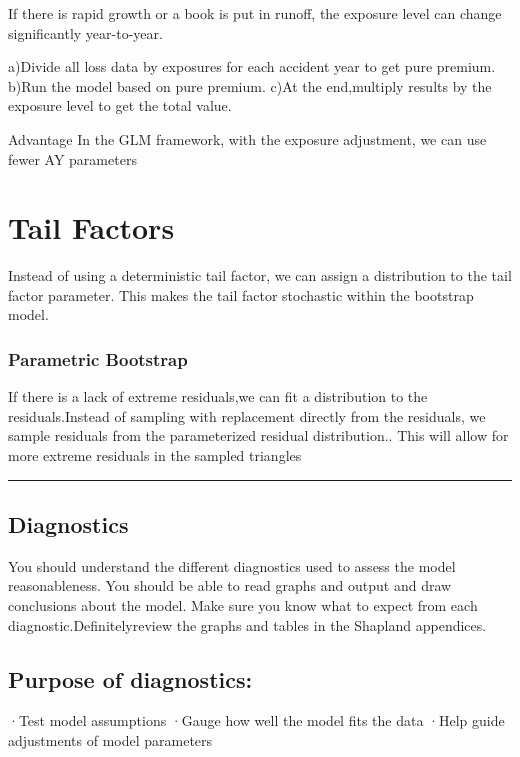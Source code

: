 \documentclass[
]{article}
\begin{document}
If there is rapid growth or a book is put in runoff, the exposure level
can change significantly year-to-year.

a)Divide all loss data by exposures for each accident year to get pure
premium. b)Run the model based on pure premium. c)At the end,multiply
results by the exposure level to get the total value.

Advantage In the GLM framework, with the exposure adjustment, we can use
fewer AY parameters

\section{Tail Factors}\label{tail-factors}

Instead of using a deterministic tail factor, we can assign a
distribution to the tail factor parameter. This makes the tail factor
stochastic within the bootstrap model.

\subsubsection{Parametric Bootstrap}\label{parametric-bootstrap}

If there is a lack of extreme residuals,we can fit a distribution to the
residuals.Instead of sampling with replacement directly from the
residuals, we sample residuals from the parameterized residual
distribution.. This will allow for more extreme residuals in the sampled
triangles

\begin{center}\rule{0.5\linewidth}{0.5pt}\end{center}

\subsection{Diagnostics}\label{diagnostics-1}

You should understand the different diagnostics used to assess the model
reasonableness. You should be able to read graphs and output and draw
conclusions about the model. Make sure you know what to expect from each
diagnostic.Definitelyreview the graphs and tables in the Shapland
appendices.

\subsection{Purpose of diagnostics:}\label{purpose-of-diagnostics}

·Test model assumptions ·Gauge how well the model fits the data ·Help
guide adjustments of model parameters
\end{document}
